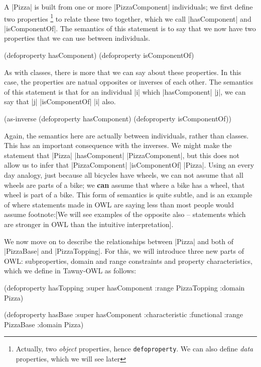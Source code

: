 A |Pizza| is built from one or more |PizzaComponent| individuals; we first
define two properties \footnote{Actually, two \emph{object} properties, hence
  \lstinline|defoproperty|. We can also define \emph{data} properties, which
  we will see later} to relate these two together, which we call
|hasComponent| and |isComponentOf|. The semantics of this statement is to say
that we now have two properties that we can use between individuals.

\begin{tawny}
(defoproperty hasComponent)
(defoproperty isComponentOf)
\end{tawny}

As with classes, there is more that we can say about these properties. In this
case, the properties are natual opposites or inverses of each other. The
semantics of this statement is that for an individual |i| which |hasComponent|
|j|, we can say that |j| |isComponentOf| |i| also. 

\begin{tawny}
(as-inverse
 (defoproperty hasComponent)
 (defoproperty isComponentOf))
\end{tawny}

Again, the semantics here are actually between individuals, rather than
classes. This has an important consequence with the inverses. We might make
the statement that |Pizza| |hasComponent| |PizzaComponent|, but this does not
allow us to infer that |PizzaComponent| |isComponentOf| |Pizza|. Using an
every day analogy, just because all bicycles have wheels, we can not assume
that all wheels are parts of a bike; we \textbf{can} assume that where a bike
has a wheel, that wheel is part of a bike. This form of semantics is quite
subtle, and is an example of where statements made in OWL are saying less than
most people would assume footnote:[We will see examples of the opposite also
-- statements which are stronger in OWL than the intuitive interpretation].

We now move on to describe the relationships between |Pizza| and both of
|PizzaBase| and |PizzaTopping|. For this, we will introduce three new parts of
OWL: subproperties, domain and range constraints and property characteristics,
which we define in Tawny-OWL as follows:

\begin{tawny}
(defoproperty hasTopping
  :super hasComponent
  :range PizzaTopping
  :domain Pizza)

(defoproperty hasBase
  :super hasComponent
  :characteristic :functional
  :range PizzaBase
  :domain Pizza)
\end{tawny}


